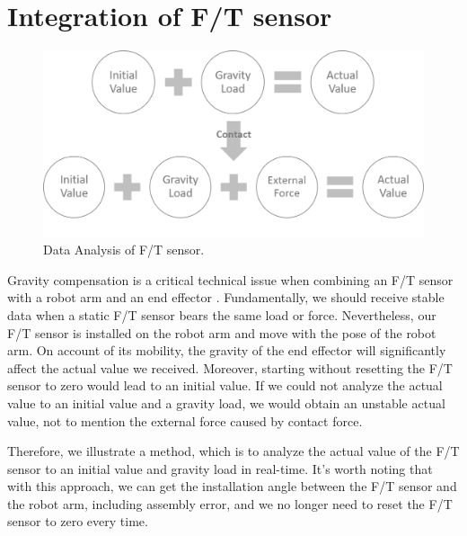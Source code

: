 \section{Integration of F/T sensor}
\label{sec:grav compen}
\begin{figure}[htbp]
\begin{center}
\includegraphics[width=1\linewidth]{Images/gravity compensation.png}
\caption{
Data Analysis of F/T sensor.
}\label{fig:gravity compensation}
\end{center}
\end{figure}
\hspace*{6mm}Gravity compensation is a critical technical issue when combining an F/T sensor with a robot arm and an end effector \cite{8997006}. 
Fundamentally, we should receive stable data when a static F/T sensor bears the same load or force. Nevertheless, our F/T sensor is installed on the robot arm and move with the pose of the robot arm. On account of its mobility, the gravity of the end effector will significantly affect the actual value we received. Moreover, starting without resetting the F/T sensor to zero would lead to an initial value. If we could not analyze the actual value to an initial value and a gravity load, we would obtain an unstable actual value, not to mention the external force caused by contact force.
\par
Therefore, we illustrate a method, which is to analyze the actual value of the F/T sensor to an initial value and gravity load in real-time. It's worth noting that with this approach, we can get the installation angle between the F/T sensor and the robot arm, including assembly error, and we no longer need to reset the F/T sensor to zero every time.
